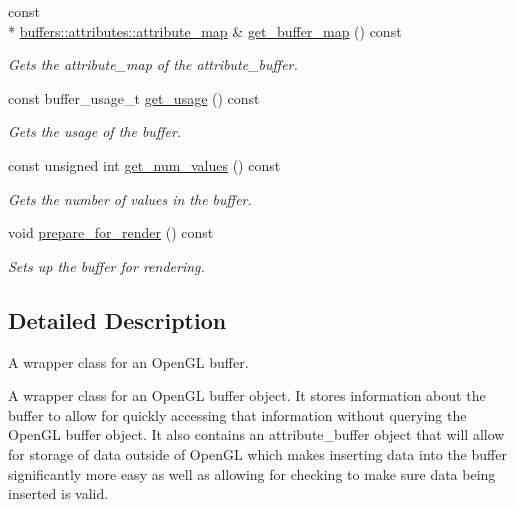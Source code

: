 \begin{DoxyCompactItemize}
const \\*
\hyperlink{classoccluded_1_1buffers_1_1attributes_1_1attribute__map}{buffers\+::attributes\+::attribute\+\_\+map} \& \hyperlink{classoccluded_1_1opengl_1_1retained_1_1gl__attribute__buffer_a1241841aa913b0df057b5d885f1447b4}{get\+\_\+buffer\+\_\+map} () const 
\begin{DoxyCompactList}\small\item\em Gets the attribute\+\_\+map of the attribute\+\_\+buffer. \end{DoxyCompactList}\item 
const buffer\+\_\+usage\+\_\+t \hyperlink{classoccluded_1_1opengl_1_1retained_1_1gl__attribute__buffer_a29426fc913cbb13615e245206b28befc}{get\+\_\+usage} () const 
\begin{DoxyCompactList}\small\item\em Gets the usage of the buffer. \end{DoxyCompactList}\item 
const unsigned int \hyperlink{classoccluded_1_1opengl_1_1retained_1_1gl__attribute__buffer_a5f2f320a6c494925fc12c378b90f00ce}{get\+\_\+num\+\_\+values} () const 
\begin{DoxyCompactList}\small\item\em Gets the number of values in the buffer. \end{DoxyCompactList}\item 
void \hyperlink{classoccluded_1_1opengl_1_1retained_1_1gl__attribute__buffer_ab7707122e284ee1c28bf238885ae6a59}{prepare\+\_\+for\+\_\+render} () const 
\begin{DoxyCompactList}\small\item\em Sets up the buffer for rendering. \end{DoxyCompactList}\end{DoxyCompactItemize}


\subsection{Detailed Description}
A wrapper class for an Open\+G\+L buffer. 

A wrapper class for an Open\+G\+L buffer object. It stores information about the buffer to allow for quickly accessing that information without querying the Open\+G\+L buffer object. It also contains an attribute\+\_\+buffer object that will allow for storage of data outside of Open\+G\+L which makes inserting data into the buffer significantly more easy as well as allowing for checking to make sure data being inserted is valid. 

